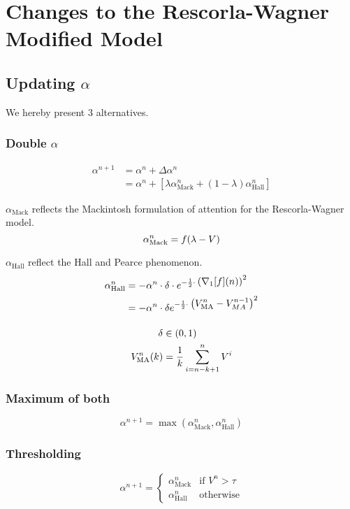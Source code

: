 \documentclass[11pt,a4paper]{article}
\newcommand{\alphamack}{\alpha _{\text{Mack}}}
\newcommand{\alphahall}{\alpha _{\text{Hall}}}
\begin{document}
\section*{Changes to the Rescorla-Wagner Modified Model}

\subsection{Updating $\alpha$}

We hereby present 3 alternatives.

\subsubsection{Double $\alpha$}
\begin{equation}
	\begin{aligned}
		\alpha ^{n + 1}
			&= \alpha ^n + \Delta \alpha ^n \\
			&= \alpha ^n + \left[ \lambda \alphamack ^n + (1 - \lambda) \alphahall ^n \right] 
	\end{aligned}
\end{equation}

$\alphamack$ reflects the Mackintosh formulation of attention for the Rescorla-Wagner model.
\begin{equation}
	\alphamack ^n = f ( \lambda - V ) \\
\end{equation}

$\alphahall$ reflect the Hall and Pearce phenomenon.
\begin{gather}
	\begin{aligned}
		\alphahall ^n &= - \alpha ^n \cdot \delta \cdot e^{- \frac{1}{2} \cdot 
		\displaystyle{ \left( \nabla_1 [ f ] ( n ) \right) ^2 }} \\
		&= - \alpha ^n \cdot \delta e ^ {- \frac{1}{2} \cdot \displaystyle{\left(V^n_{\text{MA}} - V^{n - 1}_{MA} \right) ^2}}
	\end{aligned} \\[1em]
	\begin{aligned}
		\delta &\in ( 0, 1 ) \\
		V ^n _{\text{MA}} (k) &= \frac{1}{k} \sum ^n _{i = n - k + 1} V ^i
	\end{aligned} \notag{}
\end{gather}

\subsubsection{Maximum of both}

\begin{equation}
	\alpha ^{n + 1} = \max { \left( \alphamack ^n, \alphahall ^n \right) } 
\end{equation}

\subsubsection{Thresholding}

\begin{equation}
	\alpha ^{n + 1} = \begin{cases}
		\alphamack ^n & \text{if } V^n > \tau \\
		\alphahall ^n & \text{otherwise}
	\end{cases}
\end{equation}
\end{document}
